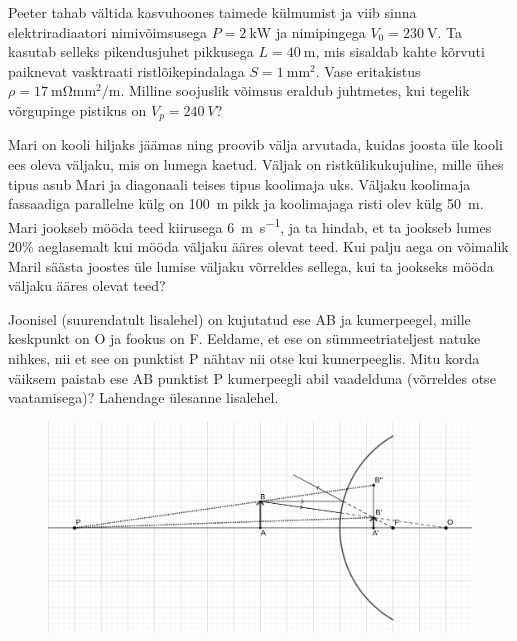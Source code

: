 \documentclass[10pt]{article}
\begin{document}

Peeter tahab vältida kasvuhoones taimede külmumist ja viib sinna elektriradiaatori nimivõimsusega $P=\qty{2}{\kW}$ ja nimipingega $V_0=\qty{230}{\V}$. Ta kasutab selleks pikendusjuhet pikkusega $L=\qty{40}{\m}$, mis  sisaldab kahte kõrvuti paiknevat vasktraati ristlõikepindalaga $S=\qty{1}{\mm\squared}$. Vase eritakistus $\rho=\qty{17}{\mohm\mm\squared\per\m}$. Milline soojuslik võimsus eraldub juhtmetes, kui tegelik võrgupinge pistikus on $V_p=\qty{240}{V}$?
\probend
\bigskip


Mari on kooli hiljaks jäämas ning proovib välja arvutada, kuidas joosta üle kooli ees oleva väljaku, mis on lumega kaetud. Väljak on ristkülikukujuline, mille ühes tipus asub Mari ja diagonaali teises tipus koolimaja uks. Väljaku koolimaja fassaadiga parallelne külg on \SI{100}{\metre} pikk ja koolimajaga risti olev külg \SI{50}{\metre}. Mari jookseb mööda teed kiirusega \SI{6}{\metre\per\second}, ja ta hindab, et ta jookseb lumes 20\% aeglasemalt kui mööda väljaku ääres olevat teed. Kui palju aega on võimalik Maril säästa joostes üle lumise väljaku võrreldes sellega, kui ta jookseks mööda väljaku ääres olevat teed?
\probend
\bigskip


Joonisel (suurendatult lisalehel) on kujutatud ese AB ja kumerpeegel, mille keskpunkt on O ja fookus on F. Eeldame, et ese on sümmeetriateljest natuke nihkes, nii et see on punktist P nähtav nii otse kui kumerpeeglis. Mitu korda väiksem paistab ese AB punktist P kumerpeegli abil vaadelduna (võrreldes otse vaatamisega)? Lahendage ülesanne lisalehel.

\begin{figure}[h]
    \centering

    \includegraphics[width=0.75\linewidth]{2023-lahg-02-yl.png}
     \vspace{-20pt}
\end{figure}
\probend
\bigskip
\end{document}
